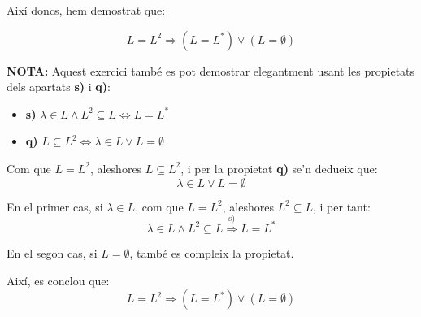 \documentclass{article}
\begin{document}
Així doncs, hem demostrat que:

\[
L = L^2 \Rightarrow (L = L^*) \vee (L = \emptyset)
\]
\begin{tcolorbox}
\textbf{NOTA:} Aquest exercici també es pot demostrar elegantment usant les propietats dels apartats \textbf{s)} i \textbf{q)}:
\begin{itemize}
    \item \textbf{s)} $ \lambda \in L \wedge L^2 \subseteq L \iff L = L^* $
    \item \textbf{q)} $ L \subseteq L^2 \iff \lambda \in L \vee L = \emptyset $
\end{itemize}

Com que $L = L^2$, aleshores $L \subseteq L^2$, i per la propietat \textbf{q)} se'n dedueix que:
\[
\lambda \in L \vee L = \emptyset
\]

En el primer cas, si \( \lambda \in L \), com que \( L = L^2 \), aleshores \( L^2 \subseteq L \), i per tant:
\[
\lambda \in L \wedge L^2 \subseteq L \overset{\text{s)}}{\Rightarrow} L = L^*
\]

En el segon cas, si \( L = \emptyset \), també es compleix la propietat.

Així, es conclou que:
\[
L = L^2 \Rightarrow (L = L^*) \vee (L = \emptyset)
\]
\end{tcolorbox}
\end{document}
